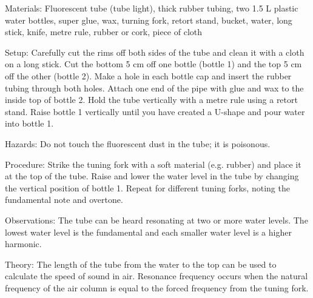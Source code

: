 \begin{multicols}{2}
\begin{description*}
\item[Materials:]{Fluorescent tube (tube light), thick rubber tubing, two 1.5 L plastic water bottles, super glue, wax, turning fork, retort stand, bucket, water, long stick, knife, metre rule, rubber or cork, piece of cloth}
\item[Setup:]{Carefully cut the rims off both sides of the tube and clean it with a cloth on a long stick. Cut the bottom 5 cm off one bottle (bottle 1) and the top 5 cm off the other (bottle 2). Make a hole in each bottle cap and insert the rubber tubing through both holes. Attach one end of the pipe with glue and wax to the inside top of bottle 2. Hold the tube vertically with a metre rule using a retort stand. Raise bottle 1 vertically until you have created a U-shape and pour water into bottle 1.}
\item[Hazards:]{Do not touch the fluorescent dust in the tube; it is poisonous.}
\item[Procedure:]{Strike the tuning fork with a soft material (e.g. rubber) and place it at the top of the tube. Raise and lower the water level in the tube by changing the vertical position of bottle 1. Repeat for different tuning forks, noting the fundamental note and overtone.}
\item[Observations:]{The tube can be heard resonating at two or more water levels. The lowest water level is the fundamental and each smaller water level is a higher harmonic.}
\item[Theory:]{The length of the tube from the water to the top can be used to calculate the speed of sound in air. Resonance frequency occurs when the natural frequency of the air column is equal to the forced frequency from the tuning fork.}
\end{description*}




\end{multicols}
